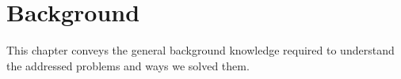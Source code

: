 \cleardoublepage
\chapter{Background}
\label{cha:Background}

This chapter conveys the general background knowledge required to understand the addressed problems and ways we solved them.





%







